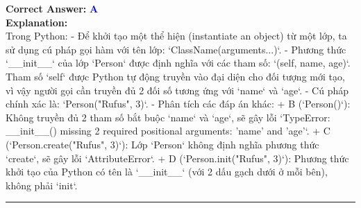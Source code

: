 \documentclass[11pt,a4paper]{article}
\begin{document}
\begin{minipage}{\textwidth}
\noindent \textbf{Correct Answer:} \textcolor{blue}{\textbf{A}} \\[4pt]
\noindent \textbf{Explanation:}\\
Trong Python:\newline
- Để khởi tạo một thể hiện (instantiate an object) từ một lớp, ta sử dụng cú pháp gọi hàm với tên lớp: `ClassName(arguments...)`.\newline
- Phương thức `__init__` của lớp `Person` được định nghĩa với các tham số: `(self, name, age)`. Tham số `self` được Python tự động truyền vào đại diện cho đối tượng mới tạo, vì vậy người gọi cần truyền đủ 2 đối số tương ứng với `name` và `age`.\newline
- Cú pháp chính xác là: `Person("Rufus", 3)`.\newline
- Phân tích các đáp án khác:\newline
  + B (`Person()`): Không truyền đủ 2 tham số bắt buộc `name` và `age`, sẽ gây lỗi `TypeError: __init__() missing 2 required positional arguments: 'name' and 'age'`.\newline
  + C (`Person.create("Rufus", 3)`): Lớp `Person` không định nghĩa phương thức `create`, sẽ gây lỗi `AttributeError`.\newline
  + D (`Person.init("Rufus", 3)`): Phương thức khởi tạo của Python có tên là `__init__` (với 2 dấu gạch dưới ở mỗi bên), không phải `init`.
\end{minipage}
\vspace{0.8cm}
\hrule
\vspace{0.5cm}
\end{document}
